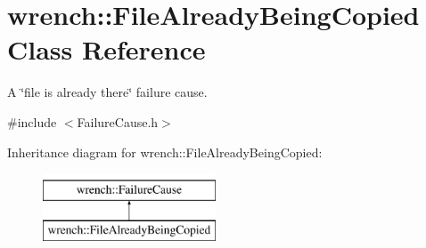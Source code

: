 \hypertarget{classwrench_1_1_file_already_being_copied}{}\section{wrench\+:\+:File\+Already\+Being\+Copied Class Reference}
\label{classwrench_1_1_file_already_being_copied}


A \char`\"{}file is already there\char`\"{} failure cause.  




{\ttfamily \#include $<$Failure\+Cause.\+h$>$}

Inheritance diagram for wrench\+:\+:File\+Already\+Being\+Copied\+:\begin{figure}[H]
\begin{center}
\leavevmode
\includegraphics[height=2.000000cm]{classwrench_1_1_file_already_being_copied}
\end{center}
\end{figure}
